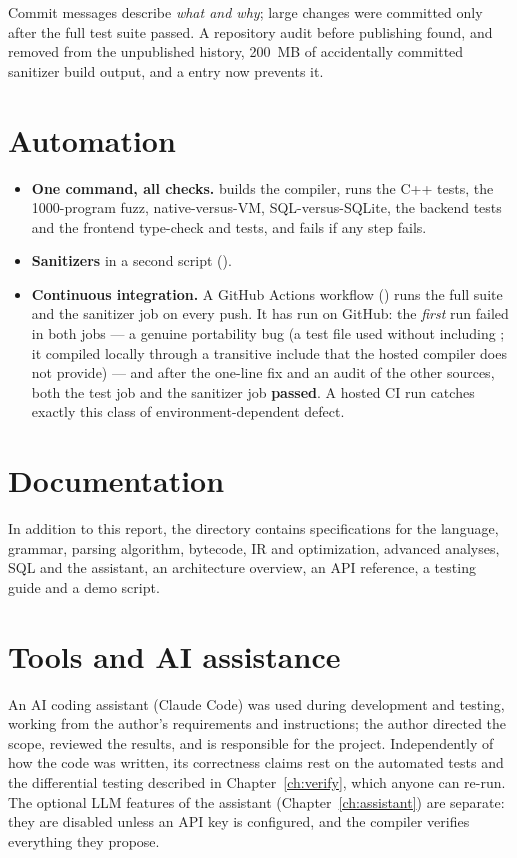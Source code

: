 \begingroup\small

\endgroup
{}

Commit messages describe \emph{what and why}; large changes were committed only after the full test suite passed. A repository audit before publishing found, and removed from the unpublished history, 200~MB of accidentally committed sanitizer build output, and a  entry now prevents it.

\section{Automation}
\begin{itemize}
  \item \textbf{One command, all checks.}  builds the compiler, runs the C++ tests, the 1000-program fuzz, native-versus-VM, SQL-versus-SQLite, the backend tests and the frontend type-check and tests, and fails if any step fails.
  \item \textbf{Sanitizers} in a second script ().
  \item \textbf{Continuous integration.} A GitHub Actions workflow () runs the full suite and the sanitizer job on every push. It has run on GitHub: the \emph{first} run failed in both jobs --- a genuine portability bug (a test file used  without including ; it compiled locally through a transitive include that the hosted compiler does not provide) --- and after the one-line fix and an audit of the other sources, both the test job and the sanitizer job \textbf{passed}. A hosted CI run catches exactly this class of environment-dependent defect.
\end{itemize}

\section{Documentation}
In addition to this report, the  directory contains specifications for the language, grammar, parsing algorithm, bytecode, IR and optimization, advanced analyses, SQL and the assistant, an architecture overview, an API reference, a testing guide and a demo script.

\section{Tools and AI assistance}
\begin{plain}[Disclosure]
An AI coding assistant (Claude Code) was used during development and testing, working from the author's requirements and instructions; the author directed the scope, reviewed the results, and is responsible for the project. Independently of how the code was written, its correctness claims rest on the automated tests and the differential testing described in Chapter~\ref{ch:verify}, which anyone can re-run. The optional LLM features of the assistant (Chapter~\ref{ch:assistant}) are separate: they are disabled unless an API key is configured, and the compiler verifies everything they propose.
\end{plain}
